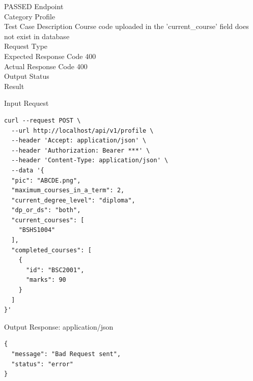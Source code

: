 \begin{testcase}{9}{PASSED}
Endpoint \hfill {}\\
Category \hfill Profile\\
Test Case Description \hfill Course code uploaded in the 'current\_course' field does not exist in database\\

Request Type    \hfill {}\\
Expected Response Code    \hfill 400\\
Actual Response Code    \hfill 400\\

Output Status \hfill {}\\
Result \hfill {}

\begin{ipblock}{Input Request}
\begin{verbatim}
curl --request POST \
  --url http://localhost/api/v1/profile \
  --header 'Accept: application/json' \
  --header 'Authorization: Bearer ***' \
  --header 'Content-Type: application/json' \
  --data '{
  "pic": "ABCDE.png",
  "maximum_courses_in_a_term": 2,
  "current_degree_level": "diploma",
  "dp_or_ds": "both",
  "current_courses": [
    "BSHS1004"
  ],
  "completed_courses": [
    {
      "id": "BSC2001",
      "marks": 90
    }
  ]
}'
\end{verbatim}
\end{ipblock}

\begin{opblock}{Output Response: application/json}
\begin{verbatim}
{
  "message": "Bad Request sent",
  "status": "error"
}
\end{verbatim}
\end{opblock}
\end{testcase}

